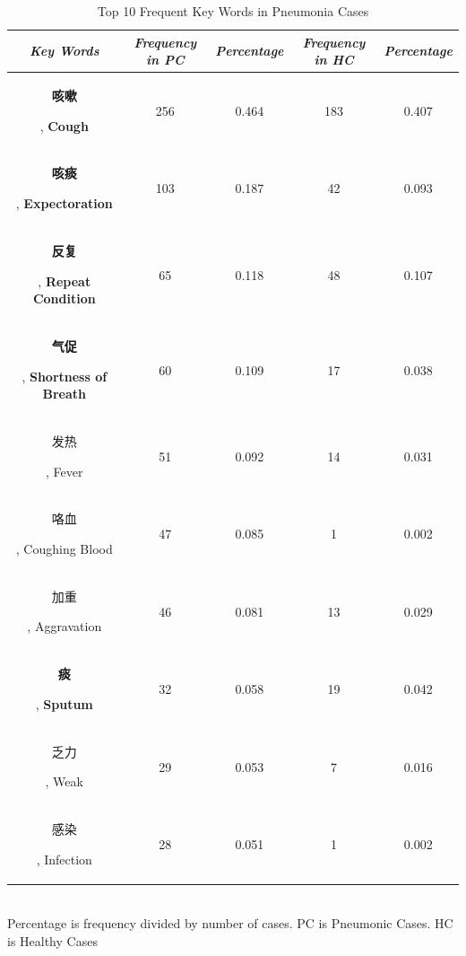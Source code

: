 \begin{table}[htb]
    \vspace{-0cm}
    \caption{Top 10 Frequent Key Words in Pneumonia Cases}
    \vspace{-0cm}
    \begin{center}
    \begin{tabular}{|c|c|c|c|c|}
        \hline
        \textbf{\textit{Key Words}} & \textbf{\textit{Frequency in PC}} & \textbf{\textit{Percentage}}& \textbf{\textit{Frequency in HC}}& \textbf{\textit{Percentage}} \\
    \hline
    \begin{CJK}{UTF8}{gbsn}\textbf{咳嗽}\end{CJK}, \textbf{Cough} & 256 & 0.464 & 183 & 0.407\\
    \begin{CJK}{UTF8}{gbsn}\textbf{咳痰}\end{CJK}, \textbf{Expectoration} & 103 & 0.187 & 42 & 0.093\\
    \begin{CJK}{UTF8}{gbsn}\textbf{反复}\end{CJK}, \textbf{Repeat Condition} & 65 & 0.118 & 48 & 0.107\\
    \begin{CJK}{UTF8}{gbsn}\textbf{气促}\end{CJK}, \textbf{Shortness of Breath} & 60 & 0.109 & 17 & 0.038\\
    \begin{CJK}{UTF8}{gbsn}发热\end{CJK}, Fever & 51 & 0.092 & 14 & 0.031\\
    \begin{CJK}{UTF8}{gbsn}咯血\end{CJK}, Coughing Blood & 47 & 0.085 & 1 & 0.002\\
    \begin{CJK}{UTF8}{gbsn}加重\end{CJK}, Aggravation & 46 & 0.081 & 13 & 0.029\\
    \begin{CJK}{UTF8}{gbsn}\textbf{痰}\end{CJK}, \textbf{Sputum} & 32 & 0.058 & 19 & 0.042\\
    \begin{CJK}{UTF8}{gbsn}乏力\end{CJK}, Weak& 29 & 0.053 & 7 & 0.016\\
    \begin{CJK}{UTF8}{gbsn}感染\end{CJK}, Infection& 28 & 0.051 & 1 & 0.002\\
    
    \hline
    \end{tabular}
    \vspace{0.1cm}
    \label{frequency1}\\
    \footnotesize{Percentage is frequency divided by number of cases. PC is Pneumonic Cases. HC is Healthy Cases}

    \end{center}
    \vspace{-0.0cm}
    \end{table}

